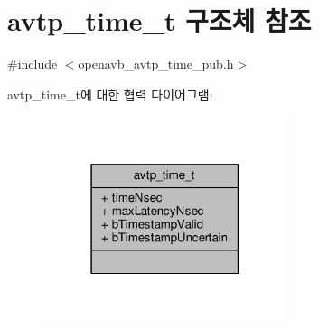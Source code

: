 \hypertarget{structavtp__time__t}{}\section{avtp\+\_\+time\+\_\+t 구조체 참조}
\label{structavtp__time__t}


{\ttfamily \#include $<$openavb\+\_\+avtp\+\_\+time\+\_\+pub.\+h$>$}



avtp\+\_\+time\+\_\+t에 대한 협력 다이어그램\+:
\nopagebreak
\begin{figure}[H]
\begin{center}
\leavevmode
\includegraphics[width=202pt]{structavtp__time__t__coll__graph}
\end{center}
\end{figure}
